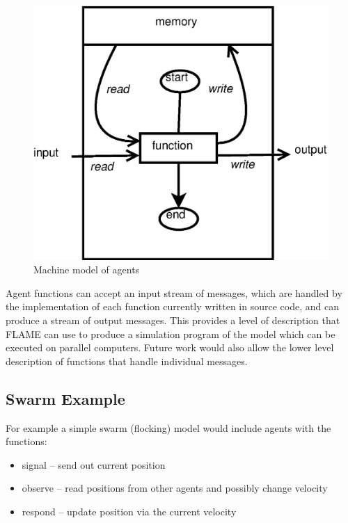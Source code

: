 \begin{figure}[ht]
\begin{center}
\includegraphics*[scale=0.5]{xmachine.eps}
\caption{Machine model of agents}
\label{fig:xmachine}
\end{center}
\end{figure}

Agent functions can accept an input stream of messages, which are handled by the
implementation of each function currently written in source code, and can
produce a stream of output messages. This provides a level of description that
FLAME can use to produce a simulation program of the model which can be
executed on parallel computers. Future work would also allow the
lower level description of functions that handle individual messages.

\subsection{Swarm Example}

For example a simple swarm (flocking) model would include agents with the
functions:

\begin{itemize}
\item signal -- send out current position
\item observe -- read positions from other agents and possibly change velocity
\item respond -- update position via the current velocity
\end{itemize}

